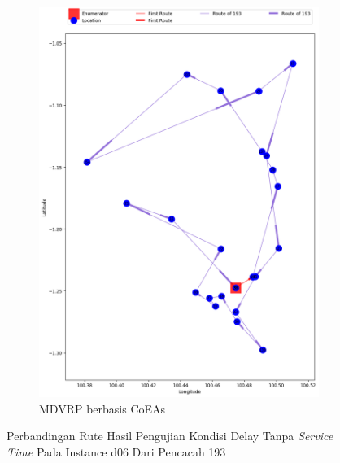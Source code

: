 \begin{figure}[H]
	\centering
	\begin{subfigure}[t]{\textwidth}
		\centering
		\includegraphics[width=\textwidth]{Resources/Images/delayed_6/real_m15_n100_delayed_6_193_coes}
		\caption{MDVRP berbasis CoEAs}
		\label{fig:real_m15_n100_delayed_6_193_coes}
	\end{subfigure}
	\caption{Perbandingan Rute Hasil Pengujian Kondisi Delay Tanpa \textit{Service Time} Pada Instance d06 Dari Pencacah 193}
	\label{fig:real_m15_n100_delayed_6_193}
\end{figure}


